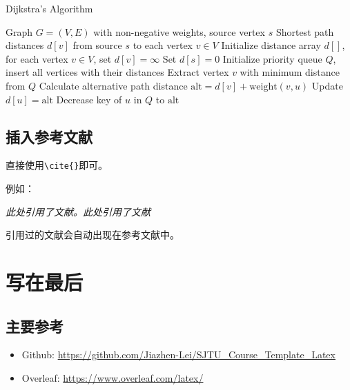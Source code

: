 \documentclass[12pt,hyperref,a4paper,UTF8]{ctexart}
\begin{document}
\begin{algorithm}
    \caption{Dijkstra's Algorithm}
    \label{alg:dijkstra}
    \begin{algorithmic}[1]
        \Require Graph $G=(V,E)$ with non-negative weights, source vertex $s$
        \Ensure Shortest path distances $d[v]$ from source $s$ to each vertex $v \in V$
        \State Initialize distance array $d[]$, for each vertex $v \in V$, set $d[v] = \infty$
        \State Set $d[s] = 0$
        \State Initialize priority queue $Q$, insert all vertices with their distances
            \State Extract vertex $v$ with minimum distance from $Q$
                \State Calculate alternative path distance $\text{alt} = d[v] + \text{weight}(v, u)$
                    \State Update $d[u] = \text{alt}$
                    \State Decrease key of $u$ in $Q$ to $\text{alt}$
                \EndIf
            \EndFor
        \EndWhile
    \end{algorithmic}
\end{algorithm}


\subsection{插入参考文献}
直接使用\verb|\cite{}|即可。

例如：


   \textit{ 此处引用了文献\cite{OFDMAbackscatter}。此处引用了文献\cite{DigiScatter}}


引用过的文献\cite{Wang2023}会自动出现在参考文献中\cite{Fan2022}。

\section{写在最后}
\subsection{主要参考}
\begin{itemize}
    \item Github: \url{https://github.com/Jiazhen-Lei/SJTU_Course_Template_Latex}
    \item Overleaf:  \url{https://www.overleaf.com/latex/}
\end{itemize}


\end{document}
